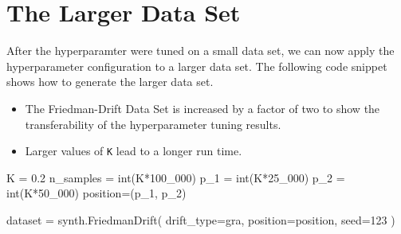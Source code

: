 \documentclass[
  letterpaper,
  DIV=11,
  numbers=noendperiod]{scrreprt}
\newenvironment{Shaded}{\begin{snugshade}}{\end{snugshade}}
\newcommand{\BuiltInTok}[1]{\textcolor[rgb]{0.00,0.23,0.31}{#1}}
\newcommand{\DecValTok}[1]{\textcolor[rgb]{0.68,0.00,0.00}{#1}}
\newcommand{\FloatTok}[1]{\textcolor[rgb]{0.68,0.00,0.00}{#1}}
\newcommand{\NormalTok}[1]{\textcolor[rgb]{0.00,0.23,0.31}{#1}}
\newcommand{\OperatorTok}[1]{\textcolor[rgb]{0.37,0.37,0.37}{#1}}
\newcommand{\StringTok}[1]{\textcolor[rgb]{0.13,0.47,0.30}{#1}}
\providecommand{\tightlist}{%
  \setlength{\itemsep}{0pt}\setlength{\parskip}{0pt}}\usepackage{longtable,booktabs,array}
\begin{document}
\hypertarget{the-larger-data-set}{%
\section{The Larger Data Set}\label{the-larger-data-set}}

After the hyperparamter were tuned on a small data set, we can now apply
the hyperparameter configuration to a larger data set. The following
code snippet shows how to generate the larger data set.

\begin{tcolorbox}[enhanced jigsaw, titlerule=0mm, colbacktitle=quarto-callout-caution-color!10!white, coltitle=black, arc=.35mm, toptitle=1mm, colback=white, left=2mm, opacityback=0, bottomtitle=1mm, bottomrule=.15mm, breakable, opacitybacktitle=0.6, colframe=quarto-callout-caution-color-frame, rightrule=.15mm, toprule=.15mm, leftrule=.75mm, title=\textcolor{quarto-callout-caution-color}{\faFire}\hspace{0.5em}{Caution: Increased Friedman-Drift Data Set}]

\begin{itemize}
\tightlist
\item
  The Friedman-Drift Data Set is increased by a factor of two to show
  the transferability of the hyperparameter tuning results.
\item
  Larger values of \texttt{K} lead to a longer run time.
\end{itemize}

\end{tcolorbox}

\begin{Shaded}
\begin{Highlighting}[]
\NormalTok{K }\OperatorTok{=} \FloatTok{0.2}
\NormalTok{n\_samples }\OperatorTok{=} \BuiltInTok{int}\NormalTok{(K}\OperatorTok{*}\DecValTok{100\_000}\NormalTok{)}
\NormalTok{p\_1 }\OperatorTok{=} \BuiltInTok{int}\NormalTok{(K}\OperatorTok{*}\DecValTok{25\_000}\NormalTok{)}
\NormalTok{p\_2 }\OperatorTok{=} \BuiltInTok{int}\NormalTok{(K}\OperatorTok{*}\DecValTok{50\_000}\NormalTok{)}
\NormalTok{position}\OperatorTok{=}\NormalTok{(p\_1, p\_2)}
\end{Highlighting}
\end{Shaded}

\begin{Shaded}
\begin{Highlighting}[]
\NormalTok{dataset }\OperatorTok{=}\NormalTok{ synth.FriedmanDrift(}
\NormalTok{   drift\_type}\OperatorTok{=}\StringTok{\textquotesingle{}gra\textquotesingle{}}\NormalTok{,}
\NormalTok{   position}\OperatorTok{=}\NormalTok{position,}
\NormalTok{   seed}\OperatorTok{=}\DecValTok{123}
\NormalTok{)}
\end{Highlighting}
\end{Shaded}
\end{document}
